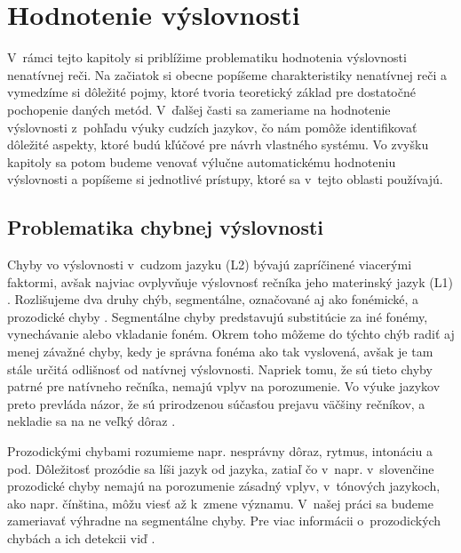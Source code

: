 
\chapter{Hodnotenie výslovnosti} \label{cha:mispronunciation-evaluation}

V~rámci tejto kapitoly si priblížime problematiku hodnotenia výslovnosti nenatívnej reči. Na začiatok si obecne popíšeme charakteristiky nenatívnej reči a vymedzíme si dôležité pojmy, ktoré tvoria teoretický základ pre dostatočné pochopenie daných metód. V~ďalšej časti sa zameriame na hodnotenie výslovnosti z~pohľadu výuky cudzích jazykov, čo nám pomôže identifikovať dôležité aspekty, ktoré budú kľúčové pre návrh vlastného systému. Vo zvyšku kapitoly sa potom budeme venovať výlučne automatickému hodnoteniu výslovnosti a popíšeme si jednotlivé prístupy, ktoré sa v~tejto oblasti používajú.

\section{Problematika chybnej výslovnosti}


Chyby vo výslovnosti v~cudzom jazyku (L2) bývajú zapríčinené viacerými faktormi,
avšak najviac ovplyvňuje výslovnosť rečníka jeho materinský jazyk (L1) \cite{Moyer2013}. 
Rozlišujeme dva druhy chýb, segmentálne, označované aj ako fonémické, a prozodické chyby \cite{Witt2012}. %
Segmentálne chyby predstavujú substitúcie za iné fonémy, vynechávanie alebo vkladanie foném. Okrem toho môžeme do týchto chýb radiť aj menej závažné chyby, kedy je správna fonéma ako tak vyslovená, avšak je tam stále určitá odlišnosť
od natívnej výslovnosti. Napriek tomu, že sú tieto chyby patrné pre natívneho
rečníka, nemajú vplyv na porozumenie. Vo výuke jazykov preto prevláda názor,
že sú prirodzenou súčasťou prejavu väčšiny rečníkov, a nekladie sa na ne veľký dôraz \cite{Murcia1996}.

Prozodickými chybami rozumieme napr. nesprávny dôraz, rytmus, intonáciu a pod. Dôležitosť prozódie sa líši jazyk od jazyka, zatiaľ čo v~napr. v~slovenčine prozodické chyby nemajú na porozumenie zásadný vplyv, v~tónových jazykoch, ako napr. čínština, môžu viesť až k~zmene významu. 
V~našej práci sa budeme zameriavať výhradne na segmentálne chyby. Pre viac informácii o~prozodických chybách a ich detekcii viď \cite{Witt2012}.

